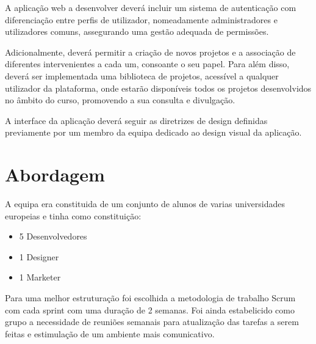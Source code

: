 A aplicação web a desenvolver deverá incluir um sistema de autenticação com diferenciação entre perfis de utilizador, nomeadamente administradores e utilizadores comuns, assegurando uma gestão adequada de permissões. 

Adicionalmente, deverá permitir a criação de novos projetos e a associação de diferentes intervenientes a cada um, consoante o seu papel. Para além disso, deverá ser implementada uma biblioteca de projetos, acessível a qualquer utilizador da plataforma, onde estarão disponíveis todos os projetos desenvolvidos no âmbito do curso, promovendo a sua consulta e divulgação.

A interface da aplicação deverá seguir as diretrizes de design definidas previamente por um membro da equipa dedicado ao design visual da aplicação.



\section{Abordagem}

A equipa era constituida de um conjunto de alunos de varias universidades europeias e tinha como constituição:

\begin{itemize}
    \item 5 Desenvolvedores
    \item 1 Designer 
    \item 1 Marketer 
\end{itemize}

Para uma melhor estruturação foi escolhida a metodologia de trabalho Scrum com cada sprint com uma duração de 2 semanas. Foi ainda estabelicido como grupo a necessidade de reuniões semanais para atualização das tarefas a serem feitas e estimulação de um ambiente mais comunicativo.
